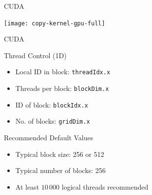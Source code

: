 
\begin{frame}[fragile]{CUDA}

 \begin{center}
  \texttt{[image: copy-kernel-gpu-full]}
 \end{center}


\end{frame}


\begin{frame}[fragile]{CUDA}

\begin{block}{Thread Control (1D)}
 \begin{itemize}
  \item Local ID in block: \lstinline|threadIdx.x|
  \item Threads per block: \lstinline|blockDim.x|
  \item ID of block: \lstinline|blockIdx.x|
  \item No. of blocks: \lstinline|gridDim.x|
 \end{itemize}
\end{block}

\begin{block}{Recommended Default Values}
 \begin{itemize}
  \item Typical block size: 256 or 512
  \item Typical number of blocks: 256
  \item At least $10\,000$ logical threads recommended
 \end{itemize}
\end{block}

\end{frame}




